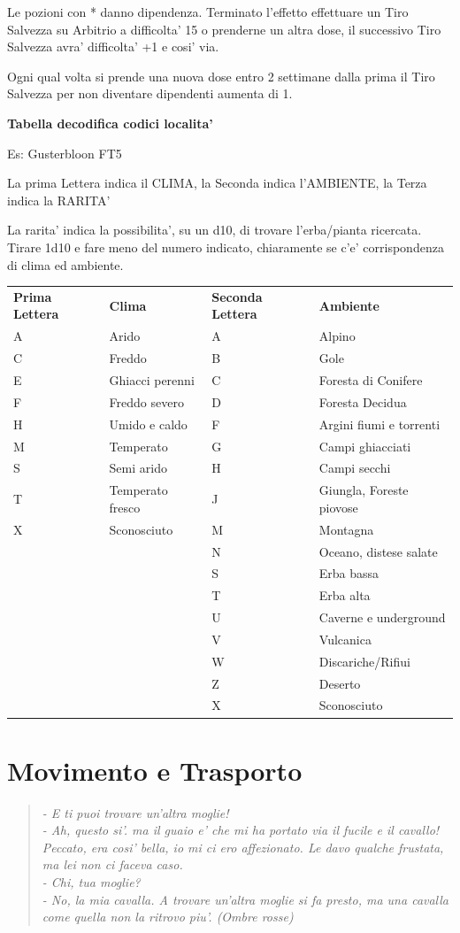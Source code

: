 \documentclass[a4paper,11pt,twoside,openany]{book}
\begin{document}
{\medskip

Le pozioni con {*} danno dipendenza. Terminato l'effetto effettuare
un Tiro Salvezza su Arbitrio a difficolta' 15 o prenderne un altra
dose, il successivo Tiro Salvezza avra' difficolta' +1 e cosi' via.

Ogni qual volta si prende una nuova dose entro 2 settimane dalla prima
il Tiro Salvezza per non diventare dipendenti aumenta di 1.

\bigskip

\textbf{Tabella decodifica codici localita'}
\smallskip

Es: Gusterbloon FT5

La prima Lettera indica il CLIMA, la Seconda indica l'AMBIENTE, la
Terza indica la RARITA'

La rarita' indica la possibilita', su un d10, di trovare l'erba/pianta
ricercata. Tirare 1d10 e fare meno del numero indicato, chiaramente
se c'e' corrispondenza di clima ed ambiente.
\bigskip

\begin{tabular}{llll}
\toprule
\textbf{Prima Lettera} & \textbf{Clima}&\textbf{Seconda Lettera} & \textbf{Ambiente}\tabularnewline
A & Arido & A & Alpino\tabularnewline
C & Freddo&B & Gole\tabularnewline
E & Ghiacci perenni&C & Foresta di Conifere\tabularnewline
F & Freddo severo&D & Foresta Decidua\tabularnewline
H & Umido e caldo&F & Argini fiumi e torrenti\tabularnewline
M & Temperato&G & Campi ghiacciati\tabularnewline
S & Semi arido&H & Campi secchi\tabularnewline
T & Temperato fresco&J & Giungla, Foreste piovose\tabularnewline
X & Sconosciuto&M & Montagna\tabularnewline
&&N & Oceano, distese salate\tabularnewline
&&S & Erba bassa\tabularnewline
&&T & Erba alta\tabularnewline
&&U & Caverne e underground\tabularnewline
&&V & Vulcanica\tabularnewline
&&W & Discariche/Rifiui\tabularnewline
&&Z & Deserto\tabularnewline
&&X & Sconosciuto\tabularnewline
\end{tabular}

\pagebreak

\section{Movimento e Trasporto}

\label{movimento-e-trasporto}



\begin{quote}\textit{
- E ti puoi trovare un'altra moglie!\\
- Ah, questo si'. ma il guaio e' che mi ha portato via il fucile e il cavallo! Peccato, era cosi' bella, io mi ci ero affezionato. Le davo qualche frustata, ma lei non ci faceva caso.\\
- Chi, tua moglie?\\
- No, la mia cavalla. A trovare un'altra moglie si fa presto, ma una cavalla come quella non la ritrovo piu'. (Ombre rosse)
}\end{quote}


}
\end{document}
